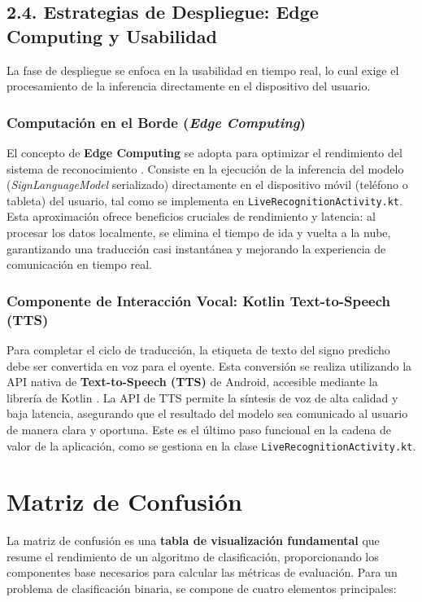 \subsection{2.4. Estrategias de Despliegue: Edge Computing y Usabilidad}
\label{subsec:edge_tts}

La fase de despliegue se enfoca en la usabilidad en tiempo real, lo cual exige el procesamiento de la inferencia directamente en el dispositivo del usuario.

\subsubsection{Computación en el Borde (\textit{Edge Computing})}
El concepto de \textbf{Edge Computing} se adopta para optimizar el rendimiento del sistema de reconocimiento \cite{ref47}. Consiste en la ejecución de la inferencia del modelo (\textit{SignLanguageModel} serializado) directamente en el dispositivo móvil (teléfono o tableta) del usuario, tal como se implementa en \texttt{LiveRecognitionActivity.kt}. Esta aproximación ofrece beneficios cruciales de rendimiento y latencia: al procesar los datos localmente, se elimina el tiempo de ida y vuelta a la nube, garantizando una traducción casi instantánea y mejorando la experiencia de comunicación en tiempo real.

\subsubsection{Componente de Interacción Vocal: Kotlin Text-to-Speech (TTS)}
Para completar el ciclo de traducción, la etiqueta de texto del signo predicho debe ser convertida en voz para el oyente. Esta conversión se realiza utilizando la API nativa de \textbf{Text-to-Speech (TTS)} de Android, accesible mediante la librería de Kotlin \cite{ref48}. La API de TTS permite la síntesis de voz de alta calidad y baja latencia, asegurando que el resultado del modelo sea comunicado al usuario de manera clara y oportuna. Este es el último paso funcional en la cadena de valor de la aplicación, como se gestiona en la clase \texttt{LiveRecognitionActivity.kt}.

\section{Matriz de Confusión}
\label{sec:confusion_matrix}

La matriz de confusión es una \textbf{tabla de visualización fundamental} que resume el rendimiento de un algoritmo de clasificación, proporcionando los componentes base necesarios para calcular las métricas de evaluación. Para un problema de clasificación binaria, se compone de cuatro elementos principales:

